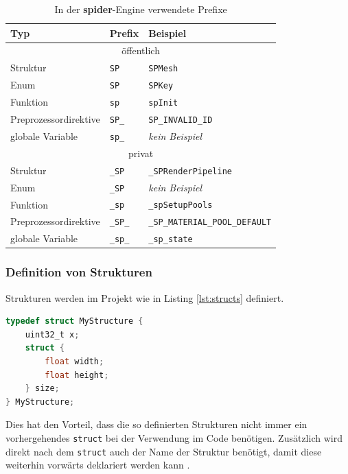 \documentclass[oneside]{ausarbeitung}
\newcommand*{\quotize}[1]{\glqq #1\grqq}
\begin{document}
\begin{table}
\begin{center}
\begin{tabular}{ |l|l|l| }
\hline
\textbf{Typ} & \textbf{Prefix} & \textbf{Beispiel} \\
\hline
\multicolumn{3}{|c|}{\quotize{öffentlich}} \\
\hline
Struktur & \texttt{SP} & \texttt{SPMesh} \\
\hline
Enum & \texttt{SP} & \texttt{SPKey} \\
\hline
Funktion & \texttt{sp} & \texttt{spInit} \\
\hline
Preprozessordirektive & \texttt{SP\_} & \texttt{SP\_INVALID\_ID} \\
\hline
globale Variable & \texttt{sp\_} & \textit{kein Beispiel} \\
\hline
\multicolumn{3}{|c|}{\quotize{privat}} \\
\hline
Struktur & \texttt{\_SP} & \texttt{\_SPRenderPipeline} \\
\hline
Enum & \texttt{\_SP} & \textit{kein Beispiel} \\
\hline
Funktion & \texttt{\_sp} & \texttt{\_spSetupPools} \\
\hline
Preprozessordirektive & \texttt{\_SP\_} & \texttt{\_SP\_MATERIAL\_POOL\_DEFAULT} \\
\hline
globale Variable & \texttt{\_sp\_} & \texttt{\_sp\_state} \\
\hline
\end{tabular}
\end{center}
\caption{In der \textbf{spider}-Engine verwendete Prefixe}
\label{tab:prefixes}
\end{table}

\subsubsection{Definition von Strukturen}
Strukturen werden im Projekt wie in Listing \ref{lst:structs} definiert.

\begin{minipage}{\textwidth}
\begin{lstlisting}[language=C, label={lst:structs}, caption={Definition von Strukturen}]
typedef struct MyStructure {
	uint32_t x;
	struct {
		float width;
		float height;
	} size;
} MyStructure;
\end{lstlisting}
\end{minipage}

Dies hat den Vorteil, dass die so definierten Strukturen nicht immer ein vorhergehendes \texttt{struct} bei der Verwendung im Code benötigen. Zusätzlich wird direkt nach dem \texttt{struct} auch der Name der Struktur benötigt, damit diese weiterhin vorwärts deklariert werden kann \cite[vgl.][]{weissflog:structs}. 
\end{document}
